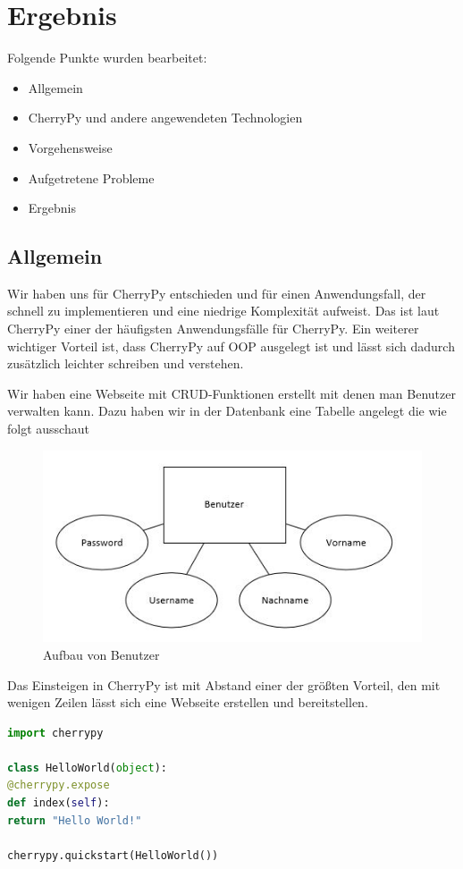 \section{Ergebnis}
\label{sec:Ergebnis}

Folgende Punkte wurden bearbeitet:


\begin{itemize}
	\item Allgemein
	\item CherryPy und andere angewendeten Technologien
	\item Vorgehensweise
	\item Aufgetretene Probleme	
	\item Ergebnis
\end{itemize}


\subsection{Allgemein}

Wir haben uns für CherryPy entschieden und für einen Anwendungsfall, der schnell zu implementieren und eine niedrige Komplexität aufweist. Das ist laut CherryPy einer der häufigsten Anwendungsfälle für CherryPy. Ein weiterer wichtiger Vorteil ist, dass CherryPy auf OOP ausgelegt ist und lässt sich dadurch zusätzlich leichter schreiben und verstehen.

Wir haben eine Webseite mit CRUD-Funktionen erstellt mit denen man Benutzer verwalten kann. 
Dazu haben wir in der Datenbank eine Tabelle angelegt die wie folgt ausschaut
\begin{figure}[!h]
\centering
\includegraphics[width=0.5\linewidth]{images/db}
\caption{Aufbau von Benutzer}
\label{fig:Benutzeraufbau}
\end{figure}


Das Einsteigen in CherryPy ist mit Abstand einer der größten Vorteil, den mit wenigen Zeilen lässt sich eine Webseite erstellen und bereitstellen.
\begin{lstlisting}[language=Python]
import cherrypy

class HelloWorld(object):
@cherrypy.expose
def index(self):
return "Hello World!"

cherrypy.quickstart(HelloWorld())
\end{lstlisting}

